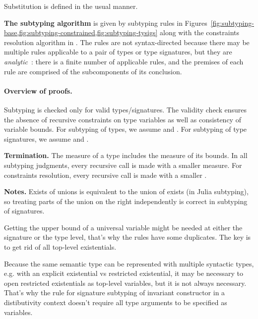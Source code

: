 Substitution is defined in the usual manner.

\textbf{The subtyping algorithm} is given by subtyping rules in
Figures~\ref{fig:subtyping-base,fig:subtyping-constrained,fig:subtyping-tysigs}
along with the constraints resolution algorithm in .
The rules are not syntax-directed because there may be multiple rules
applicable to a pair of types or type signatures,
but they are \emph{analytic}~\cite{bib:martin-lof:analytic-synthetic:1994}:
there is a finite number of applicable rules, and the premises of each rule
are comprised of the subcomponents of its conclusion.

\paragraph*{Overview of proofs.}
Subtyping is checked only for valid types/signatures.
The validity check ensures the absence of recursive constraints on type
variables as well as consistency of variable bounds.
For subtyping of types, we assume \tyvlddflt{\ty} and .
For subtyping of type signatures, we assume
\tyvlddflt{\tysig} and .

\textbf{Termination.} The measure of a type includes the measure of its bounds.
In all subtyping judgments, every recursive call is made with a smaller measure.
For constraints resolution, every recursive call is made with a smaller \UEnv.

\textbf{Notes.}
Exists of unions is equivalent to the union of exists (in Julia subtyping),
so treating parts of the union on the right independently is correct
in subtyping of signatures.

Getting the upper bound of a universal variable might be needed at either the
signature or the type level, that's why the rules have some duplicates.
The key is to get rid of all top-level existentials.

Because the same semantic type can be represented with multiple syntactic types,
e.g. with an explicit existential vs restricted existential, it may be necessary
to open restricted existentials as top-level variables, but it is not always
necessary. That's why the rule for signature subtyping of invariant
constructor in a distibutivity context doesn't require all type arguments to be
specified as variables.



